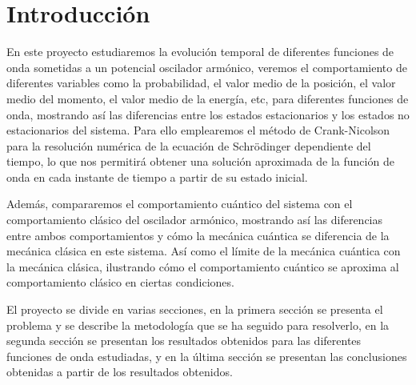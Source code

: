 \documentclass[10pt,onecolumn]{article}
\begin{document}
\tableofcontents %
\newpage

\HRule{0.5pt} %

\begin{abstract}
Estudio de la evolución temporal de varias funciones de onda sometidas a un pozo armónico, empleando el método de Crank-Nicolson para la resolución numérica de la ecuación de Schrödinger dependiente del tiempo. Las funciones de onda estudiadas incluyen las autofunciones del sistema y una función gaussiana, mostrando así las diferencias entre los estados estacionarios y los estados no estacionarios del sistema. 
\end{abstract}

\section{Introducción}
En este proyecto estudiaremos la evolución temporal de diferentes funciones de onda sometidas a un potencial oscilador armónico, veremos el comportamiento de diferentes variables como la probabilidad, el valor medio de la posición, el valor medio del momento, el valor medio de la energía, etc,  para diferentes funciones de onda, mostrando así las diferencias entre los estados estacionarios y los estados no estacionarios del sistema. Para ello emplearemos el método de Crank-Nicolson para la resolución numérica de la ecuación de Schrödinger dependiente del tiempo, lo que nos permitirá obtener una solución aproximada de la función de onda en cada instante de tiempo a partir de su estado inicial.

Además, compararemos el comportamiento cuántico del sistema con el comportamiento clásico del oscilador armónico, mostrando así las diferencias entre ambos comportamientos y cómo la mecánica cuántica se diferencia de la mecánica clásica en este sistema. Así como el límite de la mecánica cuántica con la mecánica clásica, ilustrando cómo el comportamiento cuántico se aproxima al comportamiento clásico en ciertas condiciones.


El proyecto se divide en varias secciones, en la primera sección se presenta el problema y se describe la metodología que se ha seguido para resolverlo, en la segunda sección se presentan los resultados obtenidos para las diferentes funciones de onda estudiadas, y en la última sección se presentan las conclusiones obtenidas a partir de los resultados obtenidos.
\end{document}
